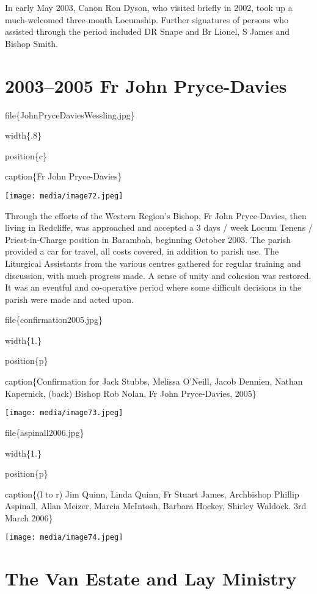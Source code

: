 In early May 2003, Canon Ron Dyson, who visited briefly in 2002, took up a much-welcomed three-month Locumship. Further signatures of persons who assisted through the period included DR Snape and Br Lionel, S James and Bishop Smith.

\hypertarget{fr-john-pryce-davies}{%
\section{2003--2005 Fr John Pryce-Davies}\label{fr-john-pryce-davies}}

file\{JohnPryceDaviesWessling.jpg\}

width\{.8\}

position\{c\}

caption\{Fr John Pryce-Davies\}

\texttt{[image: media/image72.jpeg]}

Through the efforts of the Western Region's Bishop, Fr John Pryce-Davies, then living in Redcliffe, was approached and accepted a 3 days / week Locum Tenens / Priest-in-Charge position in Barambah, beginning October 2003. The parish provided a car for travel, all costs covered, in addition to parish use. The Liturgical Assistants from the various centres gathered for regular training and discussion, with much progress made. A sense of unity and cohesion was restored. It was an eventful and co-operative period where some difficult decisions in the parish were made and acted upon.

file\{confirmation2005.jpg\}

width\{1.\}

position\{p\}

caption\{Confirmation for Jack Stubbs, Melissa O'Neill, Jacob Dennien, Nathan Kapernick, (back) Bishop Rob Nolan, Fr John Pryce-Davies, 2005\}

\texttt{[image: media/image73.jpeg]}

file\{aspinall2006.jpg\}

width\{1.\}

position\{p\}

caption\{(l to r) Jim Quinn, Linda Quinn, Fr Stuart James, Archbishop Phillip Aspinall, Allan Meizer, Marcia McIntosh, Barbara Hockey, Shirley Waldock. 3rd March 2006\}

\texttt{[image: media/image74.jpeg]}

\hypertarget{the-van-estate-and-lay-ministry}{%
\section{The Van Estate and Lay Ministry}\label{the-van-estate-and-lay-ministry}}

